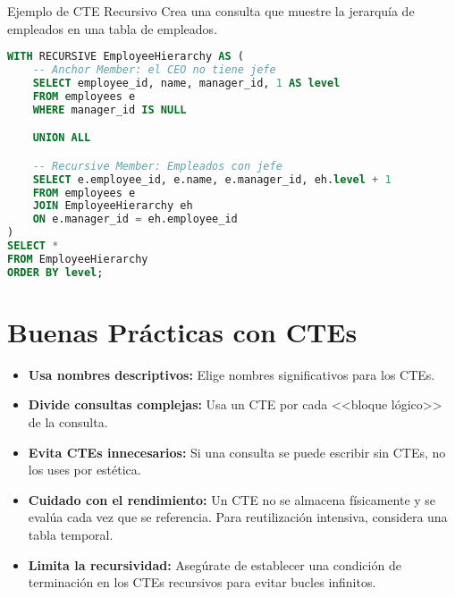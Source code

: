 \begin{examplebox}{Ejemplo de CTE Recursivo}
    Crea una consulta que muestre la jerarquía de empleados en una tabla de empleados.
\end{examplebox}

\vspace{10pt}

\begin{lstlisting}[language=SQL]
WITH RECURSIVE EmployeeHierarchy AS (
    -- Anchor Member: el CEO no tiene jefe
    SELECT employee_id, name, manager_id, 1 AS level
    FROM employees e
    WHERE manager_id IS NULL

    UNION ALL

    -- Recursive Member: Empleados con jefe
    SELECT e.employee_id, e.name, e.manager_id, eh.level + 1
    FROM employees e
    JOIN EmployeeHierarchy eh
    ON e.manager_id = eh.employee_id
)
SELECT *
FROM EmployeeHierarchy
ORDER BY level;
\end{lstlisting}

\section{Buenas Prácticas con CTEs}

\begin{itemize}
    \item \textbf{Usa nombres descriptivos:} Elige nombres significativos para los CTEs.
    \item \textbf{Divide consultas complejas:} Usa un CTE por cada <<bloque lógico>> de la consulta.
    \item \textbf{Evita CTEs innecesarios:} Si una consulta se puede escribir sin CTEs, no los uses por estética.
    \item \textbf{Cuidado con el rendimiento:} Un CTE no se almacena físicamente y se evalúa cada vez que se referencia. Para reutilización intensiva, considera una tabla temporal.
    \item \textbf{Limita la recursividad:} Asegúrate de establecer una condición de terminación en los CTEs recursivos para evitar bucles infinitos.
\end{itemize}

